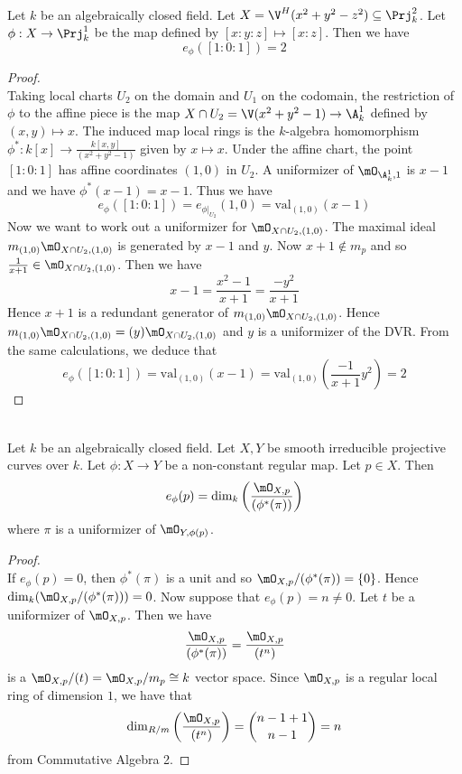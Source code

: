 \documentclass[a4paper]{article}
\begin{document}
\begin{eg}{}{}\\
Let $k$ be an algebraically closed field. Let $X=\V^H(x^2+y^2-z^2)\subseteq\Prj_k^2$. Let $\phi:X\to\Prj_k^1$ be the map defined by $[x:y:z]\mapsto[x:z]$. Then we have $$e_\phi([1:0:1])=2$$
\begin{proof}\\
Taking local charts $U_2$ on the domain and $U_1$ on the codomain, the restriction of $\phi$ to the affine piece is the map $X\cap U_2=\V(x^2+y^2-1)\to\A_k^1$ defined by $(x,y)\mapsto x$. The induced map local rings is the $k$-algebra homomorphism $\phi^\ast:k[x]\to\frac{k[x,y]}{(x^2+y^2-1)}$ given by $x\mapsto x$. Under the affine chart, the point $[1:0:1]$ has affine coordinates $(1,0)$ in $U_2$. A uniformizer of $\mO_{\A_k^1,1}$ is $x-1$ and we have $\phi^\ast(x-1)=x-1$. Thus we have $$e_\phi([1:0:1])=e_{\phi|_{U_2}}(1,0)=\text{val}_{(1,0)}(x-1)$$ Now we want to work out a uniformizer for $\mO_{X\cap U_2,(1,0)}$. The maximal ideal $m_{(1,0)}\mO_{X\cap U_2,(1,0)}$ is generated by $x-1$ and $y$. Now $x+1\notin m_p$ and so $\frac{1}{x+1}\in\mO_{X\cap U_2,(1,0)}$. Then we have $$x-1=\frac{x^2-1}{x+1}=\frac{-y^2}{x+1}$$ Hence $x+1$ is a redundant generator of $m_{(1,0)}\mO_{X\cap U_2,(1,0)}$. Hence $m_{(1,0)}\mO_{X\cap U_2,(1,0)}=(y)\mO_{X\cap U_2,(1,0)}$ and $y$ is a uniformizer of the DVR. From the same calculations, we deduce that $$e_\phi([1:0:1])=\text{val}_{(1,0)}(x-1)=\text{val}_{(1,0)}\left(\frac{-1}{x+1}y^2\right)=2$$
\end{proof}
\end{eg}

\begin{lmm}{}{}\\
Let $k$ be an algebraically closed field. Let $X,Y$ be smooth irreducible projective curves over $k$. Let $\phi:X\to Y$ be a non-constant regular map. Let $p\in X$. Then $$e_\phi(p)=\dim_k\left(\frac{\mO_{X,p}}{(\phi^\ast(\pi))}\right)$$ where $\pi$ is a uniformizer of $\mO_{Y,\phi(p)}$. 
\begin{proof}\\
If $e_\phi(p)=0$, then $\phi^\ast(\pi)$ is a unit and so $\mO_{X,p}/(\phi^\ast(\pi))=\{0\}$. Hence $\dim_k(\mO_{X,p}/(\phi^\ast(\pi)))=0$. Now suppose that $e_\phi(p)=n\neq 0$. Let $t$ be a uniformizer of $\mO_{X,p}$. Then we have $$\frac{\mO_{X,p}}{(\phi^\ast(\pi))}=\frac{\mO_{X,p}}{(t^n)}$$ is a $\mO_{X,p}/(t)=\mO_{X,p}/m_p\cong k$ vector space. Since $\mO_{X,p}$ is a regular local ring of dimension $1$, we have that $$\dim_{R/m}\left(\frac{\mO_{X,p}}{(t^n)}\right)=\binom{n-1+1}{n-1}=n$$ from Commutative Algebra 2. 
\end{proof}
\end{lmm}
\end{document}
